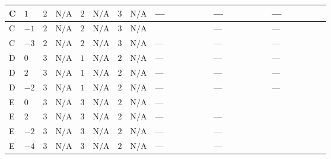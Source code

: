 \documentclass[8pt]{article}
\begin{document}
\begin{landscape}
\begin{longtable}{@{}llcccccc >{\raggedright\arraybackslash}p{0.21\linewidth} >{\raggedright\arraybackslash}p{0.21\linewidth} >{\raggedright\arraybackslash}p{0.21\linewidth}@{}}
\midrule
C & $1$ & $2$ & $\text{N/A}$ & $2$ & $\text{N/A}$ & $3$ & $\text{N/A}$ & --- & --- & --- \\
\midrule
C & $-1$ & $2$ & $\text{N/A}$ & $2$ & $\text{N/A}$ & $3$ & $\text{N/A}$ & \scriptsize\adjustbox{max width=\linewidth}{$\begin{gathered} +6 {\lambda_{10}} \left({\mu_{\mathrm{T3GeneralS1S2}}}\right)^{*}\end{gathered}$} & --- & --- \\
\midrule
C & $-3$ & $2$ & $\text{N/A}$ & $2$ & $\text{N/A}$ & $3$ & $\text{N/A}$ & --- & --- & --- \\
\midrule
D & $0$ & $3$ & $\text{N/A}$ & $1$ & $\text{N/A}$ & $2$ & $\text{N/A}$ & --- & --- & --- \\
\midrule
D & $2$ & $3$ & $\text{N/A}$ & $1$ & $\text{N/A}$ & $2$ & $\text{N/A}$ & --- & --- & --- \\
\midrule
D & $-2$ & $3$ & $\text{N/A}$ & $1$ & $\text{N/A}$ & $2$ & $\text{N/A}$ & --- & --- & --- \\
\midrule
E & $0$ & $3$ & $\text{N/A}$ & $3$ & $\text{N/A}$ & $2$ & $\text{N/A}$ & --- & \scriptsize\adjustbox{max width=\linewidth}{$\begin{gathered} 4 {\mu_{\mathrm{T3GeneralS1Sq}}} (3 \left({\lambda_{X_{5}}^{(1)}}\right)^{*}+\left({\lambda_{X_{5}}^{(2)}}\right)^{*})\end{gathered}$} & \scriptsize\adjustbox{max width=\linewidth}{$\begin{gathered} +{m_1^2} (6 {\lambda_{12}^{(1)}}+4 {\lambda_{12}^{(\times)}})\end{gathered}$} \\
\midrule
E & $2$ & $3$ & $\text{N/A}$ & $3$ & $\text{N/A}$ & $2$ & $\text{N/A}$ & --- & --- & \scriptsize\adjustbox{max width=\linewidth}{$\begin{gathered} +{m_1^2} (6 {\lambda_{12}^{(1)}}+4 {\lambda_{12}^{(\times)}})\end{gathered}$} \\
\midrule
E & $-2$ & $3$ & $\text{N/A}$ & $3$ & $\text{N/A}$ & $2$ & $\text{N/A}$ & --- & --- & \scriptsize\adjustbox{max width=\linewidth}{$\begin{gathered} +{m_1^2} (6 {\lambda_{12}^{(1)}}+4 {\lambda_{12}^{(\times)}})\end{gathered}$} \\
\midrule
E & $-4$ & $3$ & $\text{N/A}$ & $3$ & $\text{N/A}$ & $2$ & $\text{N/A}$ & --- & --- & \scriptsize\adjustbox{max width=\linewidth}{$\begin{gathered} +{m_1^2} (6 {\lambda_{12}^{(1)}}+4 {\lambda_{12}^{(\times)}})\end{gathered}$} \\
\midrule
\bottomrule
\end{longtable}
\clearpage

\end{landscape}
\end{document}
